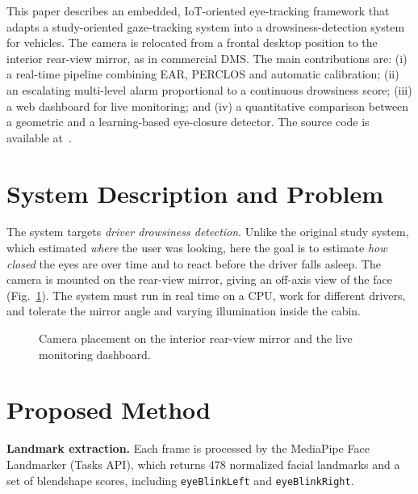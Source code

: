 \documentclass[conference]{IEEEtran}
\begin{document}
This paper describes an embedded, IoT-oriented eye-tracking framework that
adapts a study-oriented gaze-tracking system into a drowsiness-detection
system for vehicles. The camera is relocated from a frontal desktop position to
the interior rear-view mirror, as in commercial DMS. The main contributions are:
(i) a real-time pipeline combining EAR, PERCLOS and automatic calibration;
(ii) an escalating multi-level alarm proportional to a continuous drowsiness
score; (iii) a web dashboard for live monitoring; and (iv) a quantitative
comparison between a geometric and a learning-based eye-closure detector.
The source code is available at~\cite{repo}.

\section{System Description and Problem}
The system targets \emph{driver drowsiness detection}. Unlike the original
study system, which estimated \emph{where} the user was looking, here the goal
is to estimate \emph{how closed} the eyes are over time and to react before the
driver falls asleep. The camera is mounted on the rear-view mirror, giving an
off-axis view of the face (Fig.~\ref{fig:setup}). The system must run in real
time on a CPU, work for different drivers, and tolerate the mirror angle and
varying illumination inside the cabin.

\begin{figure}[t]
\centering
\caption{Camera placement on the interior rear-view mirror and the live
monitoring dashboard.}
\label{fig:setup}
\end{figure}

\section{Proposed Method}
\textbf{Landmark extraction.} Each frame is processed by the MediaPipe Face
Landmarker (Tasks API), which returns 478 normalized facial landmarks and a set
of blendshape scores, including \texttt{eyeBlinkLeft} and \texttt{eyeBlinkRight}.
\end{document}

